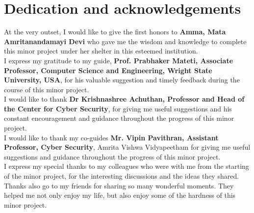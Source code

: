 %
%

\chapter*{Dedication and acknowledgements}
\begin{SingleSpace}
 At the very outset, I would like to give the first honors to\textbf{ Amma, Mata Amritanandamayi Devi} who gave me the wisdom and knowledge to complete this minor project
under her shelter in this esteemed institution.\\
I express my gratitude to my guide,\textbf{ Prof. Prabhaker Mateti, Associate Professor, Computer Science and Engineering, Wright State University, USA}, for his valuable
suggestion and timely feedback during the course of this minor project.\\
I would like to thank \textbf{Dr Krishnashree Achuthan, Professor and Head of the Center
for Cyber Security}, for giving me useful suggestions and his constant encouragement and
guidance throughout the progress of this minor project.\\
I would like to thank my co-guides\textbf{ Mr. Vipin Pavithran, Assistant Professor, Cyber
Security}, Amrita Vishwa Vidyapeetham for giving me useful suggestions and guidance
throughout the progress of this minor project.\\
I express my special thanks to my colleagues who were with me from the starting of the
minor project, for the interesting discussions and the ideas they shared. Thanks also go
to my friends for sharing so many wonderful moments. They helped me not only enjoy
my life, but also enjoy some of the hardness of this minor project.
\end{SingleSpace}
\clearpage